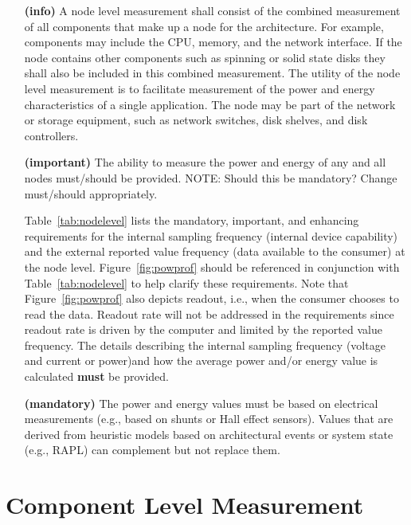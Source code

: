 \begin{itemize}

\item[\textbf{(info)}]
A node level measurement shall consist of the combined measurement of all components that 
make up a node for the architecture. For example, components may include the CPU, memory, 
and the network interface. If the node contains other components such as spinning or solid 
state disks they shall also be included in this combined measurement. The utility of the 
node level measurement is to facilitate measurement of the power and energy characteristics 
of a single application. The node may be part of the network or storage equipment, such 
as network switches, disk shelves, and disk controllers.   

\item[\textbf{(important)}]
The ability to measure the power and energy of any and all nodes must/should 
be provided.  NOTE: Should this be mandatory? Change must/should appropriately.

Table~\ref{tab:nodelevel} lists the mandatory, important, and enhancing requirements 
for the internal sampling frequency (internal device capability) and the external 
reported value frequency (data available to the consumer) at the node level. Figure~\ref{fig:powprof}
should be referenced in conjunction with Table~\ref{tab:nodelevel} to help clarify 
these requirements. Note that Figure~\ref{fig:powprof} also depicts readout, i.e., when 
the consumer chooses to read the data. Readout rate will not be addressed in the 
requirements since readout rate is driven by the computer and limited by the reported 
value frequency. The details describing the internal sampling frequency (voltage and 
current or power)and how the average power and/or energy value is calculated \textbf{must} be provided.

\item[\textbf{(mandatory)}]
The power and energy values must be based on electrical measurements (e.g., based on shunts 
or Hall effect sensors). Values that are derived from heuristic models based on 
architectural events or system state (e.g., RAPL) can complement but not replace them.
\end{itemize}


\section{Component Level Measurement}

